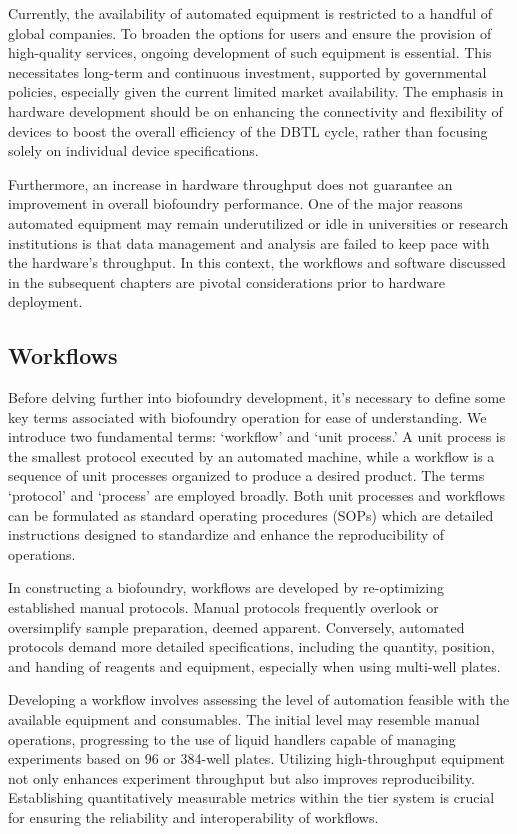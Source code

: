 \documentclass[
  letterpaper,
]{book}
\begin{document}
Currently, the availability of automated equipment is restricted to a
handful of global companies. To broaden the options for users and ensure
the provision of high-quality services, ongoing development of such
equipment is essential. This necessitates long-term and continuous
investment, supported by governmental policies, especially given the
current limited market availability. The emphasis in hardware
development should be on enhancing the connectivity and flexibility of
devices to boost the overall efficiency of the DBTL cycle, rather than
focusing solely on individual device specifications.

Furthermore, an increase in hardware throughput does not guarantee an
improvement in overall biofoundry performance. One of the major reasons
automated equipment may remain underutilized or idle in universities or
research institutions is that data management and analysis are failed to
keep pace with the hardware's throughput. In this context, the workflows
and software discussed in the subsequent chapters are pivotal
considerations prior to hardware deployment.

\subsection{Workflows}\label{workflows}

Before delving further into biofoundry development, it's necessary to
define some key terms associated with biofoundry operation for ease of
understanding. We introduce two fundamental terms: `workflow' and `unit
process.' A unit process is the smallest protocol executed by an
automated machine, while a workflow is a sequence of unit processes
organized to produce a desired product. The terms `protocol' and
`process' are employed broadly. Both unit processes and workflows can be
formulated as standard operating procedures (SOPs) which are detailed
instructions designed to standardize and enhance the reproducibility of
operations.

In constructing a biofoundry, workflows are developed by re-optimizing
established manual protocols. Manual protocols frequently overlook or
oversimplify sample preparation, deemed apparent. Conversely, automated
protocols demand more detailed specifications, including the quantity,
position, and handing of reagents and equipment, especially when using
multi-well plates.

Developing a workflow involves assessing the level of automation
feasible with the available equipment and consumables. The initial level
may resemble manual operations, progressing to the use of liquid
handlers capable of managing experiments based on 96 or 384-well plates.
Utilizing high-throughput equipment not only enhances experiment
throughput but also improves reproducibility. Establishing
quantitatively measurable metrics within the tier system is crucial for
ensuring the reliability and interoperability of workflows.
\end{document}
